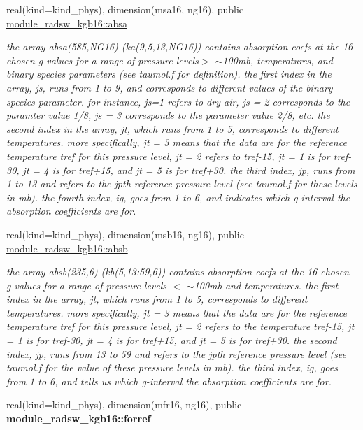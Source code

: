\begin{Indent}
\begin{DoxyCompactItemize}
real(kind=kind\+\_\+phys), dimension(msa16, ng16), public \hyperlink{group__module__radsw__kgbnn_ga51fe40b5f24cc461850fe5be40d18869}{module\+\_\+radsw\+\_\+kgb16\+::absa}
\begin{DoxyCompactList}\small\item\em the array absa(585,\+N\+G16) (ka(9,5,13,\+N\+G16)) contains absorption coefs at the 16 chosen g-\/values for a range of pressure levels$>$ $\sim$100mb, temperatures, and binary species parameters (see taumol.\+f for definition). the first index in the array, js, runs from 1 to 9, and corresponds to different values of the binary species parameter. for instance, js=1 refers to dry air, js = 2 corresponds to the paramter value 1/8, js = 3 corresponds to the parameter value 2/8, etc. the second index in the array, jt, which runs from 1 to 5, corresponds to different temperatures. more specifically, jt = 3 means that the data are for the reference temperature tref for this pressure level, jt = 2 refers to tref-\/15, jt = 1 is for tref-\/30, jt = 4 is for tref+15, and jt = 5 is for tref+30. the third index, jp, runs from 1 to 13 and refers to the jpth reference pressure level (see taumol.\+f for these levels in mb). the fourth index, ig, goes from 1 to 6, and indicates which g-\/interval the absorption coefficients are for. \end{DoxyCompactList}\item 
real(kind=kind\+\_\+phys), dimension(msb16, ng16), public \hyperlink{group__module__radsw__kgbnn_gafe8639128e4f7a48f133b7399addcb79}{module\+\_\+radsw\+\_\+kgb16\+::absb}
\begin{DoxyCompactList}\small\item\em the array absb(235,6) (kb(5,13\+:59,6)) contains absorption coefs at the 16 chosen g-\/values for a range of pressure levels $<$ $\sim$100mb and temperatures. the first index in the array, jt, which runs from 1 to 5, corresponds to different temperatures. more specifically, jt = 3 means that the data are for the reference temperature tref for this pressure level, jt = 2 refers to the temperature tref-\/15, jt = 1 is for tref-\/30, jt = 4 is for tref+15, and jt = 5 is for tref+30. the second index, jp, runs from 13 to 59 and refers to the jpth reference pressure level (see taumol.\+f for the value of these pressure levels in mb). the third index, ig, goes from 1 to 6, and tells us which g-\/interval the absorption coefficients are for. \end{DoxyCompactList}\item 
real(kind=kind\+\_\+phys), dimension(mfr16, ng16), public {\bfseries module\+\_\+radsw\+\_\+kgb16\+::forref}

\end{DoxyCompactItemize}
\end{Indent}
